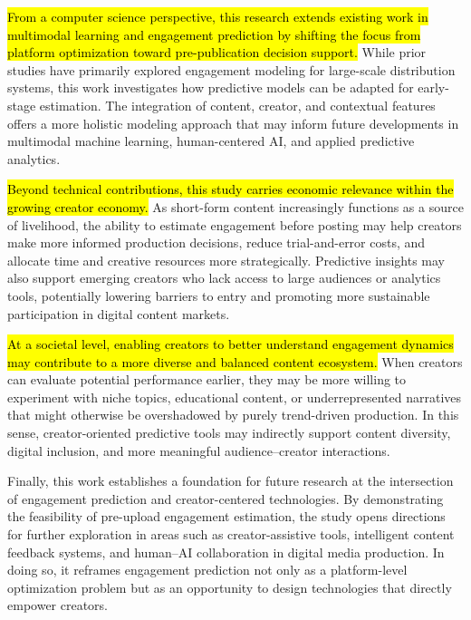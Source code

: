 \hl{From a computer science perspective, this research extends existing work in multimodal learning and engagement prediction by shifting the focus from platform optimization toward pre-publication decision support.} While prior studies have primarily explored engagement modeling for large-scale distribution systems, this work investigates how predictive models can be adapted for early-stage estimation. The integration of content, creator, and contextual features offers a more holistic modeling approach that may inform future developments in multimodal machine learning, human-centered AI, and applied predictive analytics.

\hl{Beyond technical contributions, this study carries economic relevance within the growing creator economy.} As short-form content increasingly functions as a source of livelihood, the ability to estimate engagement before posting may help creators make more informed production decisions, reduce trial-and-error costs, and allocate time and creative resources more strategically. Predictive insights may also support emerging creators who lack access to large audiences or analytics tools, potentially lowering barriers to entry and promoting more sustainable participation in digital content markets.

\hl{At a societal level, enabling creators to better understand engagement dynamics may contribute to a more diverse and balanced content ecosystem.} When creators can evaluate potential performance earlier, they may be more willing to experiment with niche topics, educational content, or underrepresented narratives that might otherwise be overshadowed by purely trend-driven production. In this sense, creator-oriented predictive tools may indirectly support content diversity, digital inclusion, and more meaningful audience--creator interactions.

Finally, this work establishes a foundation for future research at the intersection of engagement prediction and creator-centered technologies. By demonstrating the feasibility of pre-upload engagement estimation, the study opens directions for further exploration in areas such as creator-assistive tools, intelligent content feedback systems, and human--AI collaboration in digital media production. In doing so, it reframes engagement prediction not only as a platform-level optimization problem but as an opportunity to design technologies that directly empower creators.


